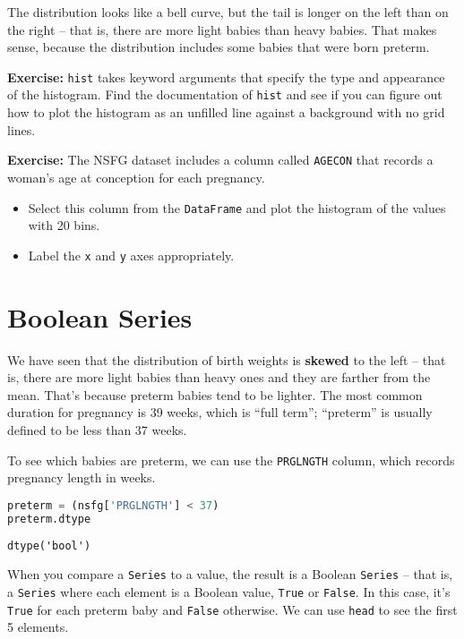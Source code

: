 The distribution looks like a bell curve, but the tail is longer on the
left than on the right -- that is, there are more light babies than
heavy babies. That makes sense, because the distribution includes some
babies that were born preterm.

\textbf{Exercise:} \passthrough{\lstinline!hist!} takes keyword
arguments that specify the type and appearance of the histogram. Find
the documentation of \passthrough{\lstinline!hist!} and see if you can
figure out how to plot the histogram as an unfilled line against a
background with no grid lines.

\textbf{Exercise:} The NSFG dataset includes a column called
\passthrough{\lstinline!AGECON!} that records a woman's age at
conception for each pregnancy.

\begin{itemize}
\item
  Select this column from the \passthrough{\lstinline!DataFrame!} and
  plot the histogram of the values with 20 bins.
\item
  Label the \passthrough{\lstinline!x!} and \passthrough{\lstinline!y!}
  axes appropriately.
\end{itemize}

\hypertarget{boolean-series}{%
\section{Boolean Series}\label{boolean-series}}

We have seen that the distribution of birth weights is \textbf{skewed}
to the left -- that is, there are more light babies than heavy ones and
they are farther from the mean. That's because preterm babies tend to be
lighter. The most common duration for pregnancy is 39 weeks, which is
``full term''; ``preterm'' is usually defined to be less than 37 weeks.

To see which babies are preterm, we can use the
\passthrough{\lstinline!PRGLNGTH!} column, which records pregnancy
length in weeks.

\begin{lstlisting}[language=Python,style=source]
preterm = (nsfg['PRGLNGTH'] < 37)
preterm.dtype
\end{lstlisting}

\begin{lstlisting}[style=output]
dtype('bool')
\end{lstlisting}

When you compare a \passthrough{\lstinline!Series!} to a value, the
result is a Boolean \passthrough{\lstinline!Series!} -- that is, a
\passthrough{\lstinline!Series!} where each element is a Boolean value,
\passthrough{\lstinline!True!} or \passthrough{\lstinline!False!}. In
this case, it's \passthrough{\lstinline!True!} for each preterm baby and
\passthrough{\lstinline!False!} otherwise. We can use
\passthrough{\lstinline!head!} to see the first 5 elements.

